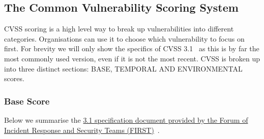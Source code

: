 \subsection{The Common Vulnerability Scoring System}

CVSS scoring is a high level way to break up vulnerabilities into different categories. Organisations can use it to choose which vulnerability to focus on first. For brevity we will only show the specifics of CVSS 3.1~\cite{CVSS_31} as this is by far the most commonly used version, even if it is not the most recent. CVSS is broken up into three distinct sections: BASE, TEMPORAL AND ENVIRONMENTAL scores.

\subsubsection{Base Score}

Below we summarise the
\href{https://www.first.org/cvss/v3.1/specification-document}{3.1 specification document
	provided by the  Forum of Incident Response and Security Teams (FIRST)}~\cite{CVSS_31}.


